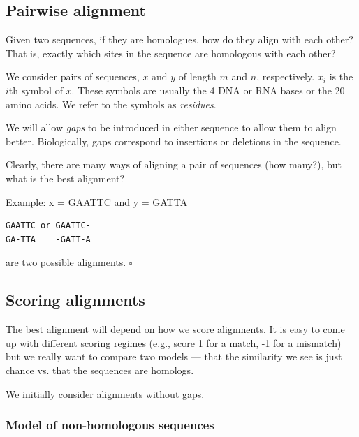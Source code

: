\documentclass[11pt]{article}
\begin{document}
\subsection{Pairwise alignment}



Given two sequences, if they are homologues, how do they align with each other?  That is, exactly which sites in the sequence are homologous with each other?  

We consider pairs of sequences, $x$ and $y$ of length $m$ and $n$, respectively. $x_i$ is the $i$th symbol of $x$. These symbols are usually the 4 DNA or RNA bases or the 20 amino acids. We refer to the symbols as {\em  residues}.

We will allow {\em gaps} to be introduced in either sequence to allow them to align better.   Biologically, gaps correspond to insertions or deletions in the sequence.

Clearly, there are many ways of aligning a pair of sequences (how many?), but what is the best alignment?

Example: x = GAATTC and y =  GATTA 
\begin{verbatim} 
GAATTC or GAATTC-
GA-TTA    -GATT-A
\end{verbatim}
are two possible alignments. \hfill $\square$

\subsection{Scoring alignments}

The best alignment will depend on how we score alignments.  It is easy to come up with different scoring regimes (e.g., score 1 for a match, -1 for a mismatch) but we really want to compare two models --- that the similarity we see is just chance vs. that the sequences are homologs. 

We initially consider alignments without gaps.



\subsubsection{Model of non-homologous  sequences}

\end{document}
